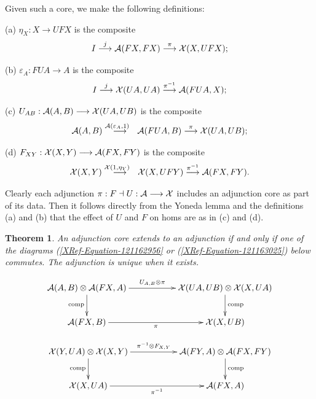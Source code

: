 \documentclass[a4paper,10pt]{article}
\newtheorem{theorem}{Theorem}
\newcommand{\ba}{{\cal{A}}}
\newcommand{\bx}{{\cal{X}}}
\numberwithin{equation}{section}
\begin{document}
Given such a core, we make the following definitions:

(a)  $\eta _{X}:X\longrightarrow U F X$ is the composite
\[I\overset{j}{\longrightarrow }\mathcal{A}( F X,F X) \overset{\pi}{\longrightarrow }\bx( X,U F X) ;\]

(b)  $\varepsilon _{A}:F U A\longrightarrow A$ is the composite\[I\overset{j}{\longrightarrow }\bx( U A,U A) \overset{\pi^{-1}}{\longrightarrow }\mathcal{A}( F U A,X) ;\]

(c)  $U_{A B}:\mathcal{A}( A,B) \longrightarrow \bx( UA,U B) $ is the composite\[\mathcal{A}( A,B) \overset{\mathcal{A}( \varepsilon _{A},1) \ \ }{\longrightarrow}\mathcal{A}( F U A,B) \overset{\pi }{\longrightarrow }\bx(U A,U B) ;\]

(d)  $F_{X Y}:\bx( X,Y) \longrightarrow \mathcal{A}( FX,F Y) $ is the composite \[\bx( X,Y) \overset{\bx( 1,\eta _{Y}) \ \ }{\longrightarrow}\bx( X,U F Y) \overset{\pi ^{-1}}{\longrightarrow }\mathcal{A}(F X,F Y) .\]

Clearly each adjunction $\pi :F\dashv U:\mathcal{A}\longrightarrow\bx$ includes an adjunction core as part of its data. Then it follows directly from the Yoneda lemma and the definitions (a) and (b) that the effect of $U$ and $F$ on homs are as in (c) and (d).

\begin{theorem}
An adjunction core extends to an adjunction if and only if one of
the diagrams (\ref{XRef-Equation-121162956} or (\ref{XRef-Equation-121163025})
below commutes. The adjunction is unique when it exists.

\begin{equation}\label{XRef-Equation-121162956}
\xymatrix{\ba (A,B) \otimes \ba (FX,A) \ar[rr]^-{U_{A,B}\otimes\pi} \ar[d]_-{\mathrm{comp}} && \bx (UA,UB) \otimes \bx (X, UA) \ar[d]^-{\mathrm{comp}} \\\ba (FX,B) \ar[rr]_-{\pi} && \bx (X,UB)}
\end{equation}

\begin{equation}\label{XRef-Equation-121163025}
\xymatrix{
\bx (Y,UA) \otimes \bx (X,Y) \ar[rr]^-{\pi^{-1}\otimes F_{X,Y}} \ar[d]_-{\mathrm{comp}} && \ba (FY,A) \otimes \ba (FX, FY) \ar[d]^-{\mathrm{comp}} \\
\bx (X,UA) \ar[rr]_-{\pi^{-1}} && \ba (FX,A)}
\end{equation}
\end{theorem}
\end{document}
